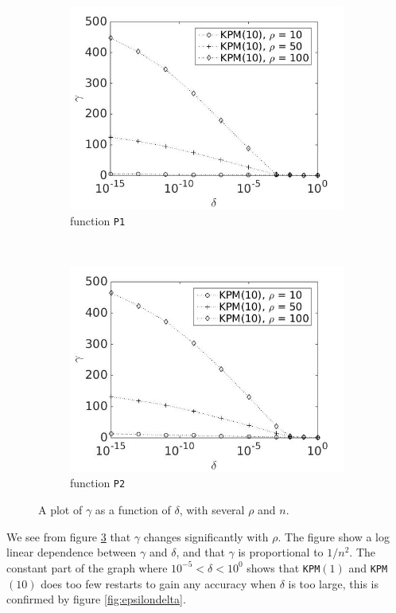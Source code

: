 \begin{figure}[H]
        \begin{subfigure}[b]{0.45\textwidth}
                \includegraphics[width=\textwidth]{fig/s13antvstol1m10}
                \caption{function \texttt{P1}}
                \label{fig:gammadelta3}
        \end{subfigure}
~
        \begin{subfigure}[b]{0.45\textwidth}
                \includegraphics[width=\textwidth]{fig/s14antvstol2m10}
                \caption{ function \texttt{P2}}
                \label{fig:gammadelta4}
        \end{subfigure}
        
        \caption{A plot of $\gamma$ as a function of $\delta$, with several $\rho$ and $n$.} \label{fig:gammadelta}
\end{figure}
We see from figure \ref{fig:gammadelta} that $\gamma$ changes significantly with $\rho$. The figure show a log linear dependence between $\gamma$ and $\delta$, and that $\gamma$ is proportional to $1/n^2$. 
The constant part of the graph where $ 10^{-5}<\delta< {10^0} $ shows that \texttt{KPM}$(1)$ and \texttt{KPM}$(10)$ does too few restarts to gain any accuracy when $\delta$ is too large, this is confirmed by figure \ref{fig:epsilondelta}. 

